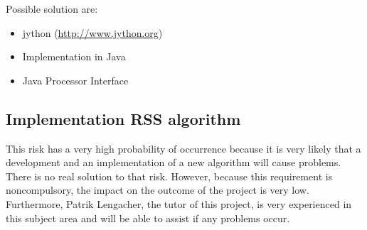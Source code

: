 Possible solution are:
\begin{itemize}
\item jython (\url{http://www.jython.org})
\item Implementation in Java
\item Java Processor Interface 
\end{itemize}


\subsection{Implementation RSS algorithm}

This risk has a very high probability of occurrence because it is very likely that a development and an implementation of a new algorithm will cause problems. There is no real solution to that risk. However, because this requirement is noncompulsory, the impact on the outcome of the project is very low. Furthermore, Patrik Lengacher, the tutor of this project, is very experienced in this subject area and will be able to assist if any problems occur.

\